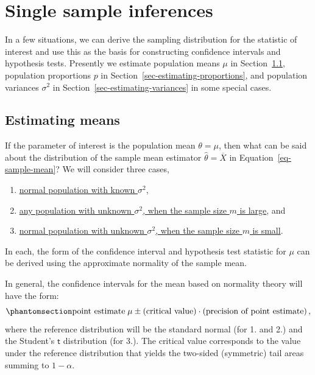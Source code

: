 \documentclass[
  a4paper,
  DIV=11,
  numbers=noendperiod,
  oneside]{scrreprt}
\providecommand{\tightlist}{%
  \setlength{\itemsep}{0pt}\setlength{\parskip}{0pt}}
\theoremstyle{plain}
\theoremstyle{definition}
\theoremstyle{definition}
\theoremstyle{definition}
\theoremstyle{plain}
\theoremstyle{remark}
\begin{document}
\chapter{Single sample inferences}\label{sec-inference-single-sample}

In a few situations, we can derive the sampling distribution for the
statistic of interest and use this as the basis for constructing
confidence intervals and hypothesis tests. Presently we estimate
population means \(\mu\) in Section~\ref{sec-estimating-means},
population proportions \(p\) in
Section~\ref{sec-estimating-proportions}, and population variances
\(\sigma^2\) in Section~\ref{sec-estimating-variances} in some special
cases.

\section{Estimating means}\label{sec-estimating-means}

If the parameter of interest is the population mean \(\theta = \mu\),
then what can be said about the distribution of the sample mean
estimator \(\widehat{\theta} = \overline{X}\) in
Equation~\ref{eq-sample-mean}? We will consider three cases,

\begin{enumerate}
\def\labelenumi{\arabic{enumi}.}
\tightlist
\item
  \hyperref[sec-mean-normal-var-known]{normal population with known
  \(\sigma^2\)},
\item
  \hyperref[sec-mean-large-sample]{any population with unknown
  \(\sigma^2\), when the sample size \(m\) is large}, and
\item
  \hyperref[sec-mean-normal-var-unknown]{normal population with unknown
  \(\sigma^2\), when the sample size \(m\) is small}.
\end{enumerate}

In each, the form of the confidence interval and hypothesis test
statistic for \(\mu\) can be derived using the approximate normality of
the sample mean.

In general, the confidence intervals for the mean based on normality
theory will have the form:
\begin{equation}\phantomsection\label{eq-ci-gen-form}{
 \text{point estimate}\; \mu \pm (\text{critical value}) \cdot (\text{precision of point estimate})\,, 
}\end{equation} where the reference distribution will be the standard
normal (for 1. and 2.) and the Student's \(\mathsf{t}\) distribution
(for 3.). The critical value corresponds to the value under the
reference distribution that yields the two-sided (symmetric) tail areas
summing to \(1-\alpha.\)
\end{document}
